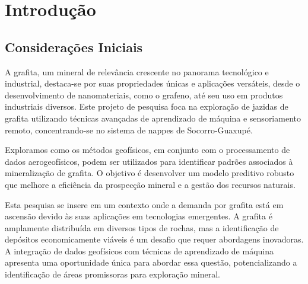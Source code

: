 \chapter{Introdução}
\section{Considerações Iniciais}
\par{A grafita, um mineral de relevância crescente no panorama tecnológico e industrial, destaca-se por suas propriedades únicas e aplicações versáteis, desde o desenvolvimento de nanomateriais, como o grafeno, até seu uso em produtos industriais diversos. Este projeto de pesquisa foca na exploração de jazidas de grafita utilizando técnicas avançadas de aprendizado de máquina e sensoriamento remoto, concentrando-se no sistema de nappes de Socorro-Guaxupé.}

\par{Exploramos como os métodos geofísicos, em conjunto com o processamento de dados aerogeofísicos, podem ser utilizados para identificar padrões associados à mineralização de grafita. O objetivo é desenvolver um modelo preditivo robusto que melhore a eficiência da prospecção mineral e a gestão dos recursos naturais.}

\par{Esta pesquisa se insere em um contexto onde a demanda por grafita está em ascensão devido às suas aplicações em tecnologias emergentes. A grafita é amplamente distribuída em diversos tipos de rochas, mas a identificação de depósitos economicamente viáveis é um desafio que requer abordagens inovadoras. A integração de dados geofísicos com técnicas de aprendizado de máquina apresenta uma oportunidade única para abordar essa questão, potencializando a identificação de áreas promissoras para exploração mineral.}
